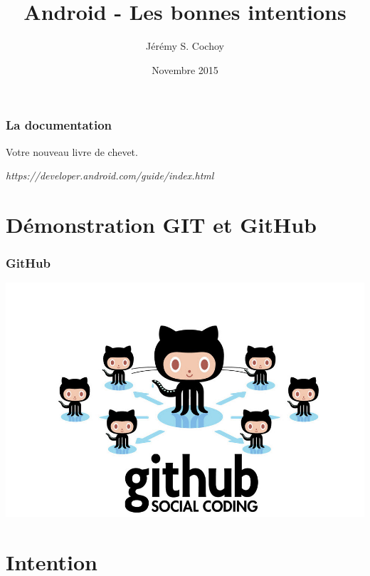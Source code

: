 \documentclass{beamer}
\begin{document}
\title{Android - Les bonnes intentions}
\author{Jérémy S. Cochoy}
\date{Novembre 2015}


\begin{frame}
\titlepage
\end{frame}

\begin{frame}
\tableofcontents
\end{frame}

\begin{frame}
\frametitle{La documentation}

\begin{block}{Votre nouveau livre de chevet.}
\begin{center}
\emph{https://developer.android.com/guide/index.html}
\end{center}
\end{block}

\end{frame}

\section{Démonstration GIT et GitHub}

\begin{frame}
\frametitle{GitHub}
\begin{center}
\includegraphics[scale=0.4]{github.jpg}
\end{center}
\end{frame}

\section{Intention}
\end{document}
